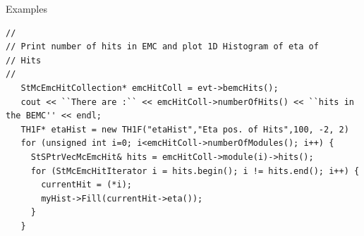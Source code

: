 \begin{Entry}
    
\item[Examples]
{\footnotesize
\begin{verbatim}
//
// Print number of hits in EMC and plot 1D Histogram of eta of
// Hits
//  
   StMcEmcHitCollection* emcHitColl = evt->bemcHits();
   cout << ``There are :`` << emcHitColl->numberOfHits() << ``hits in the BEMC'' << endl; 
   TH1F* etaHist = new TH1F("etaHist","Eta pos. of Hits",100, -2, 2)
   for (unsigned int i=0; i<emcHitColl->numberOfModules(); i++) {
     StSPtrVecMcEmcHit& hits = emcHitColl->module(i)->hits();
     for (StMcEmcHitIterator i = hits.begin(); i != hits.end(); i++) {
       currentHit = (*i);
       myHist->Fill(currentHit->eta());
     }
   }
\end{verbatim}
}%
\end{Entry}

\clearpage


%
%
